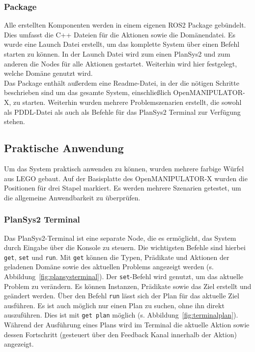\subsubsection{Package}
Alle erstellten Komponenten werden in einem eigenen \ac{ROS2} Package gebündelt.
Dies umfasst die C++ Dateien für die Aktionen sowie die Domänendatei.
Es wurde eine Launch Datei erstellt, um das komplette System über einen Befehl starten zu können.
In der Launch Datei wird zum einen \ac{PlanSys2} und zum anderen die Nodes für alle Aktionen gestartet.
Weiterhin wird hier festgelegt, welche Domäne genutzt wird.\\
Das Package enthält außerdem eine Readme-Datei, in der die nötigen Schritte beschrieben sind um das gesamte System, einschließlich OpenMANIPULATOR-X, zu starten.
Weiterhin wurden mehrere Problemszenarien erstellt, die sowohl als \ac{PDDL}-Datei als auch als Befehle für das \ac{PlanSys2} Terminal zur Verfügung stehen.

\subsection{Praktische Anwendung}
Um das System praktisch anwenden zu können, wurden mehrere farbige Würfel aus LEGO gebaut.
Auf der Basisplatte des OpenMANIPULATOR-X wurden die Positionen für drei Stapel markiert.
Es werden mehrere Szenarien getestet, um die allgemeine Anwendbarkeit zu überprüfen.
\subsubsection{PlanSys2 Terminal}
Das \ac{PlanSys2}-Terminal ist eine separate Node, die es ermöglicht, das System durch Eingabe über die Konsole zu steuern.
Die wichtigsten Befehle sind hierbei \verb|get|, \verb|set| und \verb|run|.
Mit \verb|get| können die Typen, Prädikate und Aktionen der geladenen Domäne sowie des aktuellen Problems angezeigt werden (s. Abbildung~\ref{fig:plansysterminal}).
Der \verb|set|-Befehl wird genutzt, um das aktuelle Problem zu verändern.
Es können Instanzen, Prädikate sowie das Ziel erstellt und geändert werden.
Über den Befehl \verb|run| lässt sich der Plan für das aktuelle Ziel ausführen.
Es ist auch möglich nur einen Plan zu suchen, ohne ihn direkt auszuführen.
Dies ist mit \verb|get plan| möglich (s. Abbildung~\ref{fig:terminalplan}).\\
Während der Ausführung eines Plans wird im Terminal die aktuelle Aktion sowie dessen Fortschritt (gesteuert über den Feedback Kanal innerhalb der Aktion) angezeigt.
